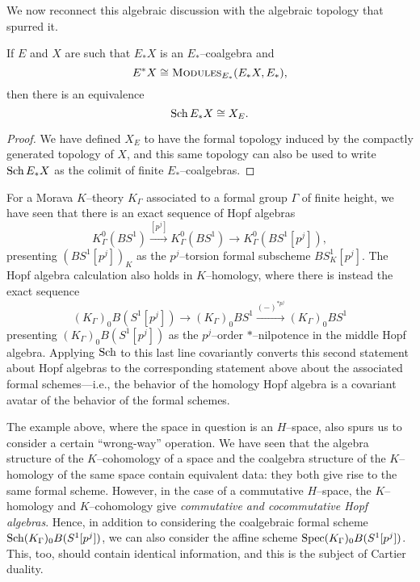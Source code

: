 We now reconnect this algebraic discussion with the algebraic topology that spurred it.

\begin{lemma}
If \(E\) and \(X\) are such that \(E_* X\) is an \(E_*\)--coalgebra and \[E^* X \cong \normalfont\textsc{Modules}_{E_*}(E_* X, E_*),\] then there is an equivalence \[\operatorname{Sch} E_* X \cong X_E.\]
\end{lemma}
\begin{proof}
We have defined \(X_E\) to have the formal topology induced by the compactly generated topology of \(X\), and this same topology can also be used to write \(\operatorname{Sch} E_* X\) as the colimit of finite \(E_*\)--coalgebras.
\end{proof}

\begin{example}\label{KtheoryOfClassifyingSpace}
For a Morava \(K\)--theory \(K_\Gamma\) associated to a formal group \(\Gamma\) of finite height, we have seen that there is an exact sequence of Hopf algebras \[K_\Gamma^0(BS^1) \xrightarrow{[p^j]} K_\Gamma^0(BS^1) \to K_\Gamma^0(BS^1[p^j]),\] presenting \((BS^1[p^j])_K\) as the \(p^j\)--torsion formal subscheme \(BS^1_K[p^j]\).  The Hopf algebra calculation also holds in \(K\)--homology, where there is instead the exact sequence \[(K_\Gamma)_0 B(S^1[p^j]) \to (K_\Gamma)_0 BS^1 \xrightarrow{(-)^{\ast p^j}} (K_\Gamma)_0 BS^1\] presenting \((K_\Gamma)_0 B(S^1[p^j])\) as the \(p^j\)--order \(\ast\)--nilpotence in the middle Hopf algebra.  Applying \(\operatorname{Sch}\) to this last line covariantly converts this second statement about Hopf algebras to the corresponding statement above about the associated formal schemes---i.e., the behavior of the homology Hopf algebra is a covariant avatar of the behavior of the formal schemes.
\end{example}

The example above, where the space in question is an \(H\)--space, also spurs us to consider a certain ``wrong-way'' operation.  We have seen that the algebra structure of the \(K\)--cohomology of a space and the coalgebra structure of the \(K\)--homology of the same space contain equivalent data: they both give rise to the same formal scheme.  However, in the case of a commutative \(H\)--space, the \(K\)--homology and \(K\)--cohomology give \emph{commutative and cocommutative Hopf algebras}.  Hence, in addition to considering the coalgebraic formal scheme \(\operatorname{Sch} (K_\Gamma)_0 B(S^1[p^j])\), we can also consider the affine scheme \(\operatorname{Spec} (K_\Gamma)_0 B(S^1[p^j])\).  This, too, should contain identical information, and this is the subject of Cartier duality.

